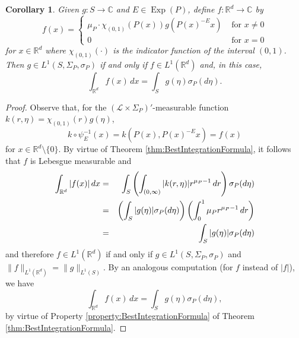 \documentclass[11pt, letter]{book}
\newtheorem{corollary}[theorem]{Corollary}
\newcommand\Exp{\operatorname{Exp}}
\begin{document}
\begin{framed}
\begin{corollary}\label{cor:IntegrateOnS}
Given $g:S\to\mathbb{C}$ and $E\in\Exp(P)$, define $f:\mathbb{R}^d\to\mathbb{C}$ by
\begin{equation*}
f(x)=\begin{cases}
\mu_P\cdot \chi_{(0,1)}(P(x))g(P(x)^{-E}x) & \mbox{ for }x\neq 0\\
0 & \mbox{ for }x=0
\end{cases}
\end{equation*}
for $x\in\mathbb{R}^d$ where $\chi_{(0,1)}(\cdot)$ is the indicator function of the interval $(0,1)$. Then $g\in L^1(S,\Sigma_P,\sigma_P)$ if and only if $f\in L^1(\mathbb{R}^d)$ and, in this case, 
\begin{equation}\label{eq:ACharacterizationofsigma}
    \int_{\mathbb{R}^d}f(x)\,dx=\int_Sg(\eta)\sigma_P(d\eta).
\end{equation}
\end{corollary}
\end{framed}
\begin{proof}
Observe that, for the $(\mathcal{L}\times\Sigma_P)'$-measurable function $k(r,\eta)=\chi_{(0,1)}(r)g(\eta)$,
\begin{equation*}
    k\circ\psi_E^{-1}(x)=k(P(x),P(x)^{-E}x)=f(x)
\end{equation*}
for $x\in\mathbb{R}^d\setminus \{0\}$. By virtue of Theorem \ref{thm:BestIntegrationFormula}, it follows that $f$ is Lebesgue measurable and 
\begin{eqnarray*}
   \int_{\mathbb{R}^d}|f(x)|\,dx&=&\int_{S}\left(\int_{(0,\infty)}|k(r,\eta)|r^{\mu_P-1}\,dr\right)\sigma_P(d\eta)\\
    &=&\left(\int_S|g(\eta)|\sigma_P(d\eta)\right)\left(\int_0^1 \mu_Pr^{\mu_P-1}\,dr\right)\\
    &=&\int_S\abs{g(\eta)}\sigma_P(d\eta)
\end{eqnarray*}
and therefore $f\in L^1(\mathbb{R}^d)$ if and only if $g\in L^1(S,\Sigma_P,\sigma_P)$ and $\|f\|_{L^1(\mathbb{R}^d)}=\|g\|_{L^1(S)}$. By an analogous computation (for $f$ instead of $|f|$), we have
\begin{equation*}
    \int_{\mathbb{R}^d}f(x)\,dx=\int_S g(\eta)\sigma_P(d\eta),
\end{equation*}
by virtue of Property \ref{property:BestIntegrationFormula} of Theorem \ref{thm:BestIntegrationFormula}. 
\end{proof}
\end{document}
